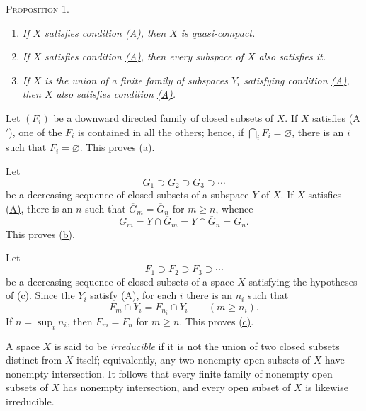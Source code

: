 \label{fac:II:1:no:30:prop:1}
\textsc{Proposition 1.}
\begin{enumerate}[label=(\alph*),leftmargin=2.5em]
\item{}\label{fac:II:1:no:30:prop:1:item:a} \textit{If $X$ satisfies condition \hyperref[fac:II:1:no:30:condition:A]{(A)}, then $X$ is quasi-compact.}
\item{}\label{fac:II:1:no:30:prop:1:item:b} \textit{If $X$ satisfies condition \hyperref[fac:II:1:no:30:condition:A]{(A)}, then every subspace of $X$ also satisfies it.}
\item{}\label{fac:II:1:no:30:prop:1:item:c} \textit{If $X$ is the union of a finite family of subspaces $Y_i$ satisfying condition \hyperref[fac:II:1:no:30:condition:A]{(A)}, then $X$ also satisfies condition \hyperref[fac:II:1:no:30:condition:A]{(A)}.}
\end{enumerate}

Let $(F_i)$ be a downward directed family of closed subsets of $X$. If $X$ satisfies \hyperref[fac:II:1:no:30:condition:A-prime]{(A$'$)}, one of the $F_i$ is contained in all the others; hence, if $\bigcap_i F_i=\varnothing$, there is an $i$ such that $F_i=\varnothing$. This proves \hyperref[fac:II:1:no:30:prop:1:item:a]{(a)}.

Let
\[
G_1\supset G_2\supset G_3\supset\cdots
\]
be a decreasing sequence of closed subsets of a subspace $Y$ of $X$. If $X$ satisfies \hyperref[fac:II:1:no:30:condition:A]{(A)}, there is an $n$ such that $\overline{G}_m=\overline{G}_n$ for $m\geq n$, whence
\[
G_m=Y\cap\overline{G}_m=Y\cap\overline{G}_n=G_n.
\]
This proves \hyperref[fac:II:1:no:30:prop:1:item:b]{(b)}.

Let
\[
F_1\supset F_2\supset F_3\supset\cdots
\]
be a decreasing sequence of closed subsets of a space $X$ satisfying the hypotheses of \hyperref[fac:II:1:no:30:prop:1:item:c]{(c)}. Since the $Y_i$ satisfy \hyperref[fac:II:1:no:30:condition:A]{(A)}, for each $i$ there is an $n_i$ such that
\[
F_m\cap Y_i=F_{n_i}\cap Y_i
\qquad(m\geq n_i).
\]
If $n=\sup_i n_i$, then $F_m=F_n$ for $m\geq n$. This proves \hyperref[fac:II:1:no:30:prop:1:item:c]{(c)}.

\label{fac:II:1:no:30:irreducible-open-properties}
A space $X$ is said to be \textit{irreducible} if it is not the union of two closed subsets distinct from $X$ itself; equivalently, any two nonempty open subsets of $X$ have nonempty intersection. It follows that every finite family of nonempty open subsets of $X$ has nonempty intersection, and every open subset of $X$ is likewise irreducible.

